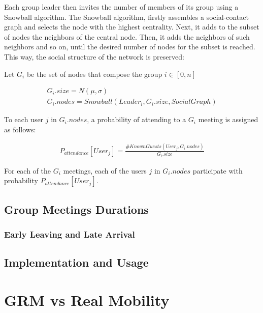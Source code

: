\documentclass[10pt, conference, letterpaper]{IEEEtran}
\begin{document}
Each group leader then invites the number of members of its group using a Snowball algorithm. The Snowball algorithm, firstly assembles a social-contact graph and selects the node with the highest centrality. Next, it adds to the subset of nodes the neighbors of the central node. Then, it adds the neighbors of such neighbors and so on, until the desired number of nodes for the subset is reached. This way, the social structure of the network is preserved:

Let $G_i$ be the set of nodes that compose the group $i \in [0,n]$

\begin{equation}\label{eq7}
\begin{split}
G_i.size = N(\mu,\sigma)\\
G_i.nodes = Snowball(Leader_i,G_i.size,SocialGraph)
\end{split}
\end{equation}

To each user $j$ in $G_i.nodes$, a probability of attending to a $G_i$ meeting is assigned as follows:

\begin{equation}\label{eq8}
\begin{split}
P_{attendance}[User_j]= \frac{\#KnownGuests(User_j,G_i.nodes)}{G_i.size}
\end{split}
\end{equation}

For each of the $G_i$ meetings, each of the users $j$ in $G_i.nodes$ participate with probability $P_{attendance}[User_j]$.

\subsection{Group Meetings Durations}

\subsubsection{Early Leaving and Late Arrival}



\subsection{Implementation and Usage}



\section{GRM vs Real Mobility}
\end{document}
